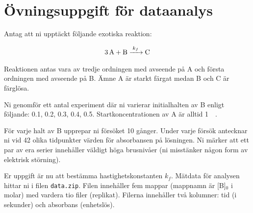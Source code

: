 \section{Övningsuppgift för dataanalys}
\label{sec:exercise}
Antag att ni upptäckt följande exotiska reaktion:

\begin{align}
  \label{eq:fourth-order}
  \ce{3A + B ->[k_f] C}
\end{align}

Reaktionen antas vara av tredje ordningen med avseende på A och första
ordningen med avseende på B. Ämne A är starkt färgat medan B och C är
färglösa.

Ni genomför ett antal experiment där ni varierar initialhalten av B enligt
följande: \SI{0.1}{\Molar}, \SI{0.2}{\Molar}, \SI{0.3}{\Molar}, \SI{0.4}{\Molar},
\SI{0.5}{\Molar}. Startkoncentrationen av A är alltid \SI{1}{\milli\Molar}.

För varje halt av B upprepar ni försöket 10 gånger. Under varje försök
antecknar ni vid 42 olika tidpunkter värden för absorbansen på lösningen.
Ni märker att ett par av era serier innehåller väldigt höga brusnivåer
(ni misstänker någon form av elektrisk störning).

Er uppgift är nu att bestämma hastighetskonstanten $k_f$. Mätdata för
analysen hittar ni i filen {\tt data.zip}. Filen innehåller fem mappar
(mappnamn är [B]$_0$ i molar) med vardera tio filer (replikat). Filerna
innehåller två kolumner: tid (i sekunder) och absorbans (enhetslös).

